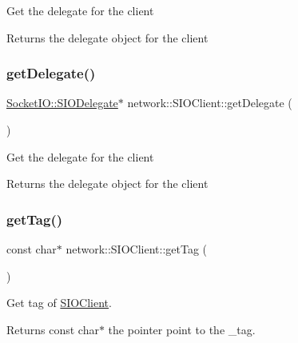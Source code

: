 Get the delegate for the client \begin{DoxyReturn}{Returns}
the delegate object for the client 
\end{DoxyReturn}
\mbox{\label{classnetwork_1_1SIOClient_a0129a31808dc90c1423f5b991e0fb9ad}} 
\subsubsection{\texorpdfstring{get\+Delegate()}{getDelegate()}\hspace{0.1cm}{\footnotesize\ttfamily [2/2]}}
{\footnotesize\ttfamily \hyperlink{classnetwork_1_1SocketIO_1_1SIODelegate}{Socket\+I\+O\+::\+S\+I\+O\+Delegate}$\ast$ network\+::\+S\+I\+O\+Client\+::get\+Delegate (\begin{DoxyParamCaption}{ }\end{DoxyParamCaption})\hspace{0.3cm}{\ttfamily [inline]}}

Get the delegate for the client \begin{DoxyReturn}{Returns}
the delegate object for the client 
\end{DoxyReturn}
\mbox{\label{classnetwork_1_1SIOClient_a4a3c602ea681844be68e158a95a0e75d}} 
\subsubsection{\texorpdfstring{get\+Tag()}{getTag()}\hspace{0.1cm}{\footnotesize\ttfamily [1/2]}}
{\footnotesize\ttfamily const char$\ast$ network\+::\+S\+I\+O\+Client\+::get\+Tag (\begin{DoxyParamCaption}{ }\end{DoxyParamCaption})\hspace{0.3cm}{\ttfamily [inline]}}

Get tag of \hyperlink{classnetwork_1_1SIOClient}{S\+I\+O\+Client}. \begin{DoxyReturn}{Returns}
const char$\ast$ the pointer point to the \+\_\+tag. 
\end{DoxyReturn}
\mbox{\label{classnetwork_1_1SIOClient_a4a3c602ea681844be68e158a95a0e75d}} 
